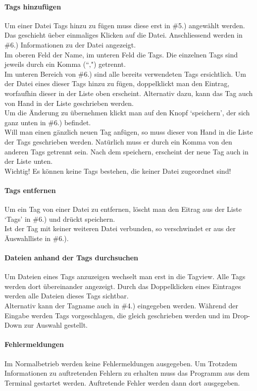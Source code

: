 \documentclass[10pt,paper=a4,final]{scrartcl}
\begin{document}
\paragraph{Tags hinzuf\"ugen}
Um einer Datei Tags hinzu zu f\"ugen muss diese erst in \#5.) angew\"ahlt werden. Das geschieht \"ueber einmaliges Klicken auf die Datei. Anschliessend werden in \#6.) Informationen zu der Datei angezeigt.\\
Im oberen Feld der Name, im unteren Feld die Tags. Die einzelnen Tags sind jeweils durch ein Komma (“,") getrennt.\\
Im unteren Bereich von \#6.) sind alle bereits verwendeten Tags ersichtlich. Um der Datei eines dieser Tags hinzu zu f\"ugen, doppelklickt man den Eintrag, worfaufhin dieser in der Liste oben erscheint. Alternativ dazu, kann das Tag auch von Hand in der Liste geschrieben werden.\\
Um die \"Anderung zu \"ubernehmen klickt man auf den Knopf ‘speichern’, der sich ganz unten in \#6.) befindet.\\
Will man einen g\"anzlich neuen Tag anf\"ugen, so muss dieser von Hand in die Liste der Tags geschrieben werden. Nat\"urlich muss er durch ein Komma von den anderen Tags getrennt sein.
Nach dem speichern, erscheint der neue Tag auch in der Liste unten.\\
Wichtig! Es k\"onnen keine Tags bestehen, die keiner Datei zugeordnet sind!
\paragraph{Tags entfernen}
Um ein Tag von einer Datei zu entfernen, l\"oscht man den Eitrag aus der Liste ‘Tags’ in \#6.) und dr\"uckt speichern.\\
Ist der Tag mit keiner weiteren Datei verbunden, so verschwindet er aus der \"Auswahlliste in \#6.).
\paragraph{Dateien anhand der Tags durchsuchen}
Um Dateien eines Tags anzuzeigen wechselt man erst in die Tagview. Alle Tags werden dort \"ubereinander angezeigt. Durch das Doppelklicken eines Eintrages werden alle Dateien dieses Tags sichtbar.\\
Alternativ kann der Tagname auch in \#4.) eingegeben werden. W\"ahrend der Eingabe werden Tags vorgeschlagen, die gleich geschrieben werden und im Drop-Down zur Auswahl gestellt.
\paragraph{Fehlermeldungen}
Im Normalbetrieb werden keine Fehlermeldungen ausgegeben. Um Trotzdem Informationen zu auftretenden Fehlern zu erhalten muss das Programm aus dem Terminal gestartet werden. Auftretende Fehler werden dann dort ausgegeben.
\end{document}

